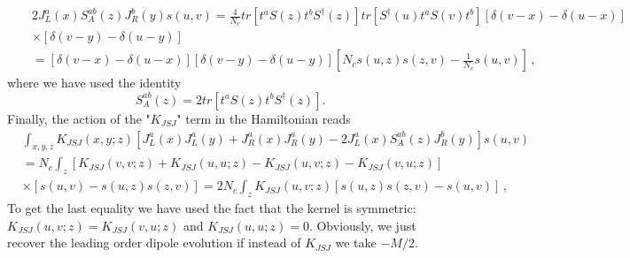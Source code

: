 \documentclass[11pt,a4paper]{article}
\def\beq{\begin{equation}}
\def\eeq{\end{equation}}
\def\beq{\begin{equation}}
\def\eeq{\end{equation}}
\begin{document}
\begin{eqnarray}
&&2J_{L}^{a}(x)S_A^{ab}(z)J_{R}^{b}(y)s(u,v)=\frac{4}{N_{c}}tr\left[t^{a}S(z)t^{b}S^{\dagger}(z)\right]tr\left[S^{\dagger}(u)t^{a}S(v)t^{b}\right]\left[\delta(v-x)-\delta(u-x)\right]
\nonumber \\ && \times \left[\delta(v-y)-\delta(u-y)\right]\nonumber \\
&&=\left[\delta(v-x)-\delta(u-x)\right]\left[\delta(v-y)-\delta(u-y)\right]\left[N_{c}s(u,z)s(z,v)-\frac{1}{N_{c}}s(u,v)\right]\,,
\end{eqnarray}
where we have used the identity
 \beq S_{A}^{ab}(z)=2tr\left[t^{a}S(z)t^{b}S^{\dagger}(z)\right]\label{adjoint}.\eeq
 Finally, the action of the "$K_{JSJ}$" term in the Hamiltonian  reads 
\begin{equation}\begin{split}&\int_{x,y,z}K_{JSJ}(x,y;z)\left[J_{L}^{a}(x)J_{L}^{a}(y)+J_{R}^{a}(x)J_{R}^{a}(y)-2J_{L}^{a}(x)S_A^{ab}(z)J_{R}^{b}(y)\right]s(u,v)\\
&=N_{c}\int_{z}\left[K_{JSJ}(v,v;z)+K_{JSJ}(u,u;z)-K_{JSJ}(u,v;z)-K_{JSJ}(v,u;z)\right]\\
&\times \left[s(u,v)-s(u,z)s(z,v)\right]=2N_{c}\int_{z}K_{JSJ}(u,v;z)\left[s(u,z)s(z,v)-s(u,v)\right]\,,
\end{split}\end{equation}
To get the last equality we have used the fact that the kernel is symmetric: $K_{JSJ}(u,v;z)=K_{JSJ}(v,u;z)$ and $K_{JSJ}(u,u;z)=0$.
Obviously, we just recover the leading order dipole evolution if instead of $K_{JSJ}$ we take $-M/2$.
\end{document}
